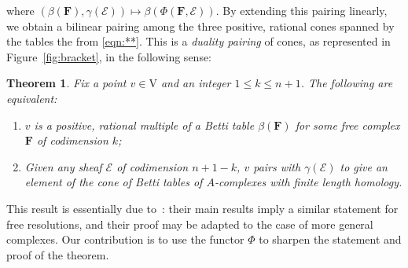 \documentclass[12pt]{amsart}
\newtheorem{thm}[lemma]{Theorem}
\theoremstyle{definition}
\theoremstyle{remark}
\newcommand{\VV}{\mathrm{V}}
\newcommand{\cE}{\mathcal{E}}
\newcommand{\FF}{\mathbf{F}}
\begin{document}
where $(\beta(\FF),\gamma(\cE))\mapsto \beta(\Phi(\FF,\cE))$.  By extending this pairing linearly, we obtain a bilinear pairing among the three positive, rational cones spanned by the tables the from \eqref{eqn:**}.  This is
 a \emph{duality pairing} of cones, as represented in Figure~\ref{fig:bracket},
in the following sense:
\begin{thm}\label{thm:duality}
Fix a point $v\in \VV$ and an integer $1\leq k\leq n+1$.   The following are equivalent:
\begin{enumerate}
	\item   $v$ is a positive, rational multiple of a Betti table $\beta(\FF)$ for some free complex $\FF$ of codimension $k$;
	\item  Given any sheaf $\cE$ of codimension $n+1-k$, $v$ pairs with $\gamma(\cE)$ to give an element of the cone of Betti tables of $A$-complexes with finite length homology.
\end{enumerate}
\end{thm}
This result is essentially due to~\cite{eis-schrey1}: their main results imply a similar statement for free resolutions, and their proof may be adapted to the case of more general complexes.  Our contribution is to use the functor $\Phi$ to sharpen the statement and proof of the theorem.  %
\end{document}
